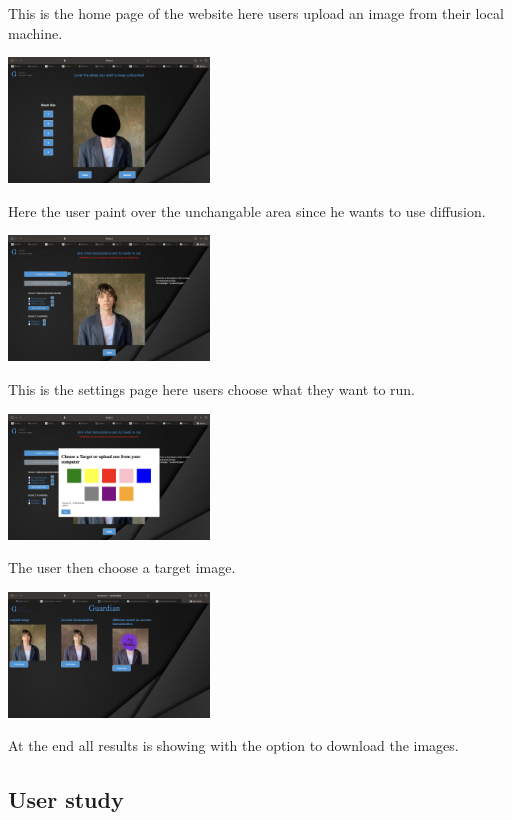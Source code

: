 \documentclass[sigconf]{acmart}
\begin{document}
This is the home page of the website here users upload an image from their local machine.

\includegraphics[width=0.4\textwidth]{3}

Here the user paint over the unchangable area since he wants to use diffusion.

\includegraphics[width=0.4\textwidth]{4}

This is the settings page here users choose what they want to run.

\includegraphics[width=0.4\textwidth]{2}

The user then choose a target image.

\includegraphics[width=0.4\textwidth]{5}

At the end all results is showing with the option to download the images.

\subsection{User study}
\end{document}
